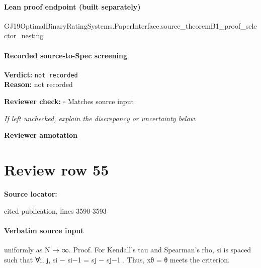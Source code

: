 \documentclass[10pt]{article}
\newcommand{\reviewerbox}{%
  \par\noindent\fbox{\parbox{0.96\linewidth}{\rule{0pt}{0.38in}}}\par
}
\newcommand{\reviewmatch}[1]{%
  \par\noindent\textbf{Reviewer check:} $\square$\; #1\par
  \noindent\emph{If left unchecked, explain the discrepancy or uncertainty below.}\par
}
\begin{document}
\paragraph{Lean proof endpoint (built separately)}\begin{ReviewVerbatim}
GJ19OptimalBinaryRatingSystems.PaperInterface.source_theoremB1_proof_selector_nesting
\end{ReviewVerbatim}

\paragraph{Recorded source-to-Spec screening}
\textbf{Verdict:} \texttt{not recorded}
\\
\textbf{Reason:} not recorded
\reviewmatch{Matches source input}
\noindent\textbf{Reviewer annotation}\par
\reviewerbox
\clearpage
\hypertarget{source-claim-b7febbacfb3801fa}{}
\section*{Review row 55}
\textbf{Source locator:} {\footnotesize\raggedright cited publication, lines 3590-\allowbreak{}3593\par}
\paragraph{Verbatim source input}
\begin{ReviewVerbatim}
uniformly as N → ∞.
Proof. For Kendall’s tau and Spearman’s rho, {si } is spaced such that ∀i, j, si − si−1 = sj − sj−1 .
Thus, xθ = θ meets the criterion.
\end{ReviewVerbatim}
\end{document}
